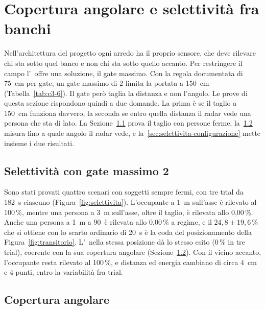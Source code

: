 \section{Copertura angolare e selettività fra banchi}
\label{sec:angolare}

Nell'architettura del progetto ogni arredo ha il proprio sensore, che deve rilevare chi sta sotto quel banco e non chi sta sotto quello accanto. Per restringere il campo l'\ldb\ offre una soluzione, il gate massimo. Con la regola documentata di 75~cm per gate, un gate massimo di 2 limita la portata a 150~cm (Tabella~\ref{tab:c3-6}). Il gate però taglia la distanza e non l'angolo. Le prove di questa sezione rispondono quindi a due domande. La prima è se il taglio a 150~cm funziona davvero, la seconda se entro quella distanza il radar vede una persona che sta di lato. La Sezione~\ref{sec:selettivita} prova il taglio con persone ferme, la~\ref{sec:angolare-copertura} misura fino a quale angolo il radar vede, e la~\ref{sec:selettivita-configurazione} mette insieme i due risultati.

\subsection{Selettività con gate massimo 2}
\label{sec:selettivita}

Sono stati provati quattro scenari con
soggetti sempre fermi, con tre trial da 182~s ciascuno (Figura~\ref{fig:selettivita}).
L'occupante a 1~m sull'asse è rilevato al 100\,\%, mentre una persona a 3~m sull'asse,
oltre il taglio, è rilevata allo 0,00\,\%. Anche una persona a 1~m a 90\textdegree\ è rilevata allo 0,00\,\% a regime, e il $24{,}8 \pm 19{,}6\,\%$ che si ottiene con lo scarto ordinario di 20~s è la coda del posizionamento della Figura~\ref{fig:transitorio}. L'\ldc\ nella stessa posizione dà lo stesso esito (0\,\% in tre trial), coerente con la sua copertura angolare (Sezione~\ref{sec:angolare-copertura}). Con il vicino accanto, l'occupante resta rilevato al 100\,\%, e distanza ed energia cambiano di circa 4~cm e 4 punti, entro la variabilità fra trial.

\subsection{Copertura angolare}
\label{sec:angolare-copertura}

